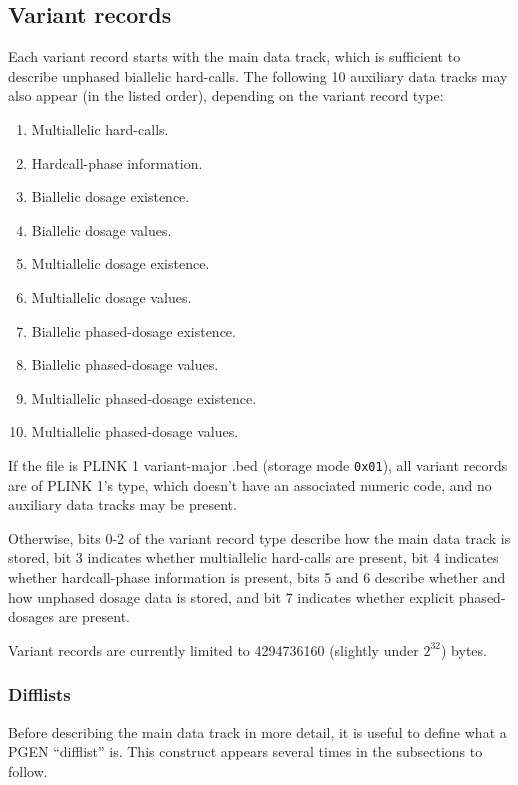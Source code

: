 \documentclass[8pt]{article}
\begin{document}
\subsection{Variant records}
\label{sec:vr}

Each variant record starts with the main data track, which is sufficient to
describe unphased biallelic hard-calls.  The following 10 auxiliary data tracks
may also appear (in the listed order), depending on the variant record type:

\begin{enumerate}
\item Multiallelic hard-calls.
\item Hardcall-phase information.
\item Biallelic dosage existence.
\item Biallelic dosage values.
\item Multiallelic dosage existence.
\item Multiallelic dosage values.
\item Biallelic phased-dosage existence.
\item Biallelic phased-dosage values.
\item Multiallelic phased-dosage existence.
\item Multiallelic phased-dosage values.
\end{enumerate}

If the file is PLINK 1 variant-major .bed (storage mode \texttt{0x01}), all
variant records are of PLINK 1's type, which doesn't have an associated numeric
code, and no auxiliary data tracks may be present.

Otherwise, bits 0-2 of the variant record type describe how the main data track
is stored, bit 3 indicates whether multiallelic hard-calls are present, bit 4
indicates whether hardcall-phase information is present, bits 5 and 6 describe
whether and how unphased dosage data is stored, and bit 7 indicates whether
explicit phased-dosages are present.

Variant records are currently limited to 4294736160 (slightly under $2^{32}$)
bytes.

\subsubsection{Difflists}

Before describing the main data track in more detail, it is useful to define
what a PGEN ``difflist'' is.  This construct appears several times in the
subsections to follow.
\end{document}
